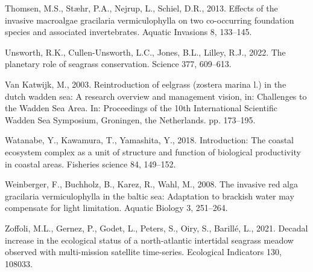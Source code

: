 \documentclass[
  letterpaper,
  DIV=11,
  numbers=noendperiod]{scrartcl}
\newlength{\cslhangindent}
\newenvironment{CSLReferences}[2] %
 {\begin{list}{}{%
  \setlength{\itemindent}{0pt}
  \setlength{\leftmargin}{0pt}
  \setlength{\parsep}{0pt}
  \ifodd #1
   \setlength{\leftmargin}{\cslhangindent}
   \setlength{\itemindent}{-1\cslhangindent}
  \fi
  \setlength{\itemsep}{#2\baselineskip}}}
 {\end{list}}
\begin{document}
\begin{CSLReferences}{1}{0}
Thomsen, M.S., Stæhr, P.A., Nejrup, L., Schiel, D.R., 2013. Effects of
the invasive macroalgae gracilaria vermiculophylla on two co-occurring
foundation species and associated invertebrates. Aquatic Invasions 8,
133--145.

Unsworth, R.K., Cullen-Unsworth, L.C., Jones, B.L., Lilley, R.J., 2022.
The planetary role of seagrass conservation. Science 377, 609--613.

Van Katwijk, M., 2003. Reintroduction of eelgrass (zostera marina l.) in
the dutch wadden sea: A research overview and management vision, in:
Challenges to the Wadden Sea Area. In: Proceedings of the 10th
International Scientific Wadden Sea Symposium, Groningen, the
Netherlands. pp. 173--195.

Watanabe, Y., Kawamura, T., Yamashita, Y., 2018. Introduction: The
coastal ecosystem complex as a unit of structure and function of
biological productivity in coastal areas. Fisheries science 84,
149--152.

Weinberger, F., Buchholz, B., Karez, R., Wahl, M., 2008. The invasive
red alga gracilaria vermiculophylla in the baltic sea: Adaptation to
brackish water may compensate for light limitation. Aquatic Biology 3,
251--264.

Zoffoli, M.L., Gernez, P., Godet, L., Peters, S., Oiry, S., Barillé, L.,
2021. Decadal increase in the ecological status of a north-atlantic
intertidal seagrass meadow observed with multi-mission satellite
time-series. Ecological Indicators 130, 108033.

\end{CSLReferences}
\end{document}
